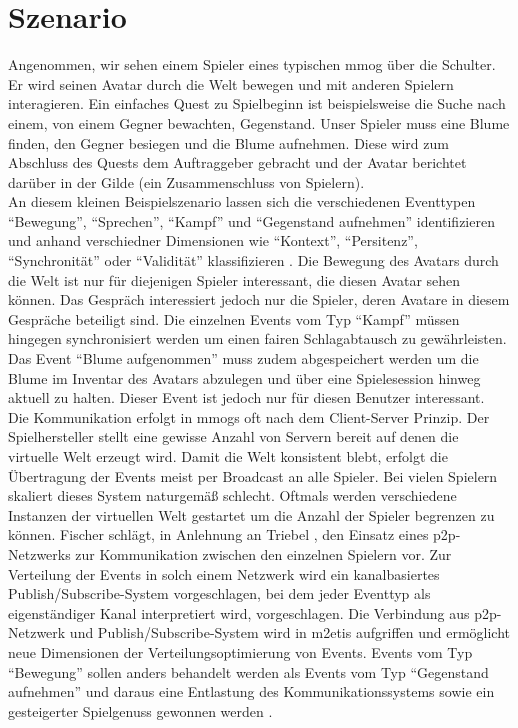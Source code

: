 \section{Szenario}
\label{chap:grundlagen:szenario}
Angenommen, wir sehen einem Spieler eines typischen \ac{mmog} über die Schulter. Er wird seinen Avatar durch die Welt bewegen und mit anderen Spielern interagieren. Ein einfaches Quest zu Spielbeginn ist beispielsweise die Suche nach einem, von einem Gegner bewachten, Gegenstand. Unser Spieler muss eine Blume finden, den Gegner besiegen und die Blume aufnehmen. Diese wird zum Abschluss des Quests dem Auftraggeber gebracht und der Avatar berichtet darüber in der Gilde (ein Zusammenschluss von Spielern).\\
An diesem kleinen Beispielszenario lassen sich die verschiedenen Eventtypen ``Bewegung'', ``Sprechen'', ``Kampf'' und ``Gegenstand aufnehmen'' identifizieren und anhand verschiedner Dimensionen wie ``Kontext'', ``Persitenz'', ``Synchronität'' oder ``Validität'' klassifizieren \cite{Fischer2010Event}. Die Bewegung des Avatars durch die Welt ist nur für diejenigen Spieler interessant, die diesen Avatar sehen können. Das Gespräch interessiert jedoch nur die Spieler, deren Avatare in diesem Gespräche beteiligt sind. Die einzelnen Events vom Typ ``Kampf'' müssen hingegen synchronisiert werden um einen fairen Schlagabtausch zu gewährleisten. Das Event ``Blume aufgenommen'' muss zudem abgespeichert werden um die Blume im Inventar des Avatars abzulegen und über eine Spielesession hinweg aktuell zu halten. Dieser Event ist jedoch nur für diesen Benutzer interessant.\\
Die Kommunikation erfolgt in \acp{mmog} oft nach dem Client-Server Prinzip. Der Spielhersteller stellt eine gewisse Anzahl von Servern bereit auf denen die virtuelle Welt erzeugt wird. Damit die Welt konsistent blebt, erfolgt die Übertragung der Events meist per Broadcast an alle Spieler. Bei vielen Spielern skaliert dieses System naturgemäß schlecht. Oftmals werden verschiedene Instanzen der virtuellen Welt gestartet um die Anzahl der Spieler begrenzen zu können. Fischer schlägt, in Anlehnung an Triebel \cite{Triebel2008Peertopeer}, den Einsatz eines \ac{p2p}-Netzwerks zur Kommunikation zwischen den einzelnen Spielern vor. Zur Verteilung der Events in solch einem Netzwerk wird ein kanalbasiertes Publish/Subscribe-System vorgeschlagen, bei dem jeder Eventtyp als eigenständiger Kanal interpretiert wird, vorgeschlagen. Die Verbindung aus \ac{p2p}-Netzwerk und Publish/Subscribe-System wird in \ac{m2etis} aufgriffen und ermöglicht neue Dimensionen der Verteilungsoptimierung von Events. Events vom Typ ``Bewegung'' sollen anders behandelt werden als Events vom Typ ``Gegenstand aufnehmen'' und daraus eine Entlastung des Kommunikationssystems sowie ein gesteigerter Spielgenuss gewonnen werden  \cite{Fischer2010a}.

